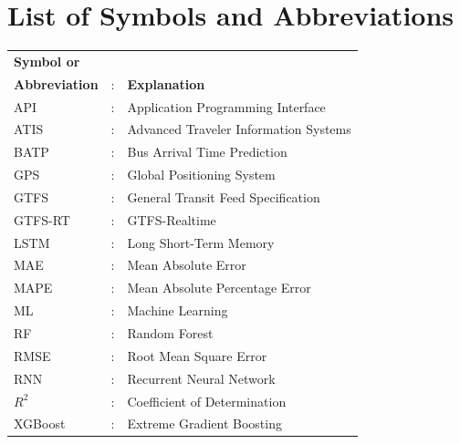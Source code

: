 \chapter*{List of Symbols and Abbreviations}

\begin{tabular}{lcl}
    \textbf{Symbol or}&&\\
    \textbf{Abbreviation} &:& \textbf{Explanation}\\


    API   &:& Application Programming Interface\\
    ATIS  &:& Advanced Traveler Information Systems\\
    BATP  &:& Bus Arrival Time Prediction\\
    GPS   &:& Global Positioning System\\
    GTFS  &:& General Transit Feed Specification\\
    GTFS-RT &:& GTFS-Realtime\\
    LSTM  &:& Long Short-Term Memory\\
    MAE   &:& Mean Absolute Error\\
    MAPE  &:& Mean Absolute Percentage Error\\
    ML    &:& Machine Learning\\
    RF    &:& Random Forest\\
    RMSE  &:& Root Mean Square Error\\
    RNN   &:& Recurrent Neural Network\\
    $R^2$ &:& Coefficient of Determination\\
    XGBoost &:& Extreme Gradient Boosting\\

\end{tabular}

\clearpage
